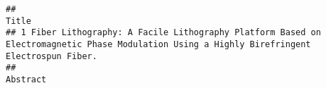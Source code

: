 \documentclass[
  a4paper]{article}
\begin{document}
\begin{verbatim}
##                                                                                                                                       Title
## 1 Fiber Lithography: A Facile Lithography Platform Based on Electromagnetic Phase Modulation Using a Highly Birefringent Electrospun Fiber.
##                                                                                                                                                                                                                                                                                                                                                                                                                                                                                                                                                                                                                                                                                                                                                                                                                                                                                                                                                                                                                                                                                                                                                                                                                                                                                                                                                                                                                                                                                                                                                                                                                                                                                                                                                                                               Abstract

\end{verbatim}
\end{document}
